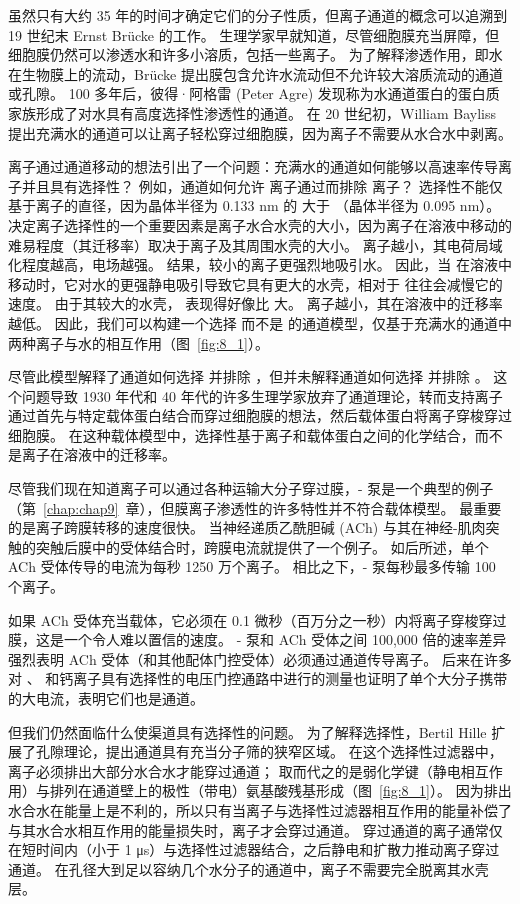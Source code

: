 虽然只有大约 35 年的时间才确定它们的分子性质，但离子通道的概念可以追溯到 19 世纪末 Ernst Brücke 的工作。
生理学家早就知道，尽管细胞膜充当屏障，但细胞膜仍然可以渗透水和许多小溶质，包括一些离子。
为了解释渗透作用，即水在生物膜上的流动，Brücke 提出膜包含允许水流动但不允许较大溶质流动的通道或孔隙。
100 多年后，彼得·阿格雷 (Peter Agre) 发现称为水通道蛋白的蛋白质家族形成了对水具有高度选择性渗透性的通道。
在 20 世纪初，William Bayliss 提出充满水的通道可以让离子轻松穿过细胞膜，因为离子不需要从水合水中剥离。


离子通过通道移动的想法引出了一个问题：充满水的通道如何能够以高速率传导离子并且具有选择性？
例如，通道如何允许  离子通过而排除  离子？
选择性不能仅基于离子的直径，因为晶体半径为 0.133 nm 的  大于 （晶体半径为 0.095 nm）。
决定离子选择性的一个重要因素是离子水合水壳的大小，因为离子在溶液中移动的难易程度（其迁移率）取决于离子及其周围水壳的大小。
离子越小，其电荷局域化程度越高，电场越强。
结果，较小的离子更强烈地吸引水。
因此，当  在溶液中移动时，它对水的更强静电吸引导致它具有更大的水壳，相对于  往往会减慢它的速度。
由于其较大的水壳， 表现得好像比  大。
离子越小，其在溶液中的迁移率越低。
因此，我们可以构建一个选择  而不是  的通道模型，仅基于充满水的通道中两种离子与水的相互作用（图~\ref{fig:8_1}）。


尽管此模型解释了通道如何选择  并排除 ，但并未解释通道如何选择  并排除 。
这个问题导致 1930 年代和 40 年代的许多生理学家放弃了通道理论，转而支持离子通过首先与特定载体蛋白结合而穿过细胞膜的想法，然后载体蛋白将离子穿梭穿过细胞膜。
在这种载体模型中，选择性基于离子和载体蛋白之间的化学结合，而不是离子在溶液中的迁移率。


尽管我们现在知道离子可以通过各种运输大分子穿过膜，- 泵是一个典型的例子（第~\ref{chap:chap9}~章），但膜离子渗透性的许多特性并不符合载体模型。
最重要的是离子跨膜转移的速度很快。 
当神经递质乙酰胆碱 (ACh) 与其在神经-肌肉突触的突触后膜中的受体结合时，跨膜电流就提供了一个例子。
如后所述，单个 ACh 受体传导的电流为每秒 1250 万个离子。
相比之下，- 泵每秒最多传输 100 个离子。


如果 ACh 受体充当载体，它必须在 0.1 微秒（百万分之一秒）内将离子穿梭穿过膜，这是一个令人难以置信的速度。
- 泵和 ACh 受体之间 100,000 倍的速率差异强烈表明 ACh 受体（和其他配体门控受体）必须通过通道传导离子。
后来在许多对 、 和钙离子具有选择性的电压门控通路中进行的测量也证明了单个大分子携带的大电流，表明它们也是通道。

但我们仍然面临什么使渠道具有选择性的问题。
为了解释选择性，Bertil Hille 扩展了孔隙理论，提出通道具有充当分子筛的狭窄区域。
在这个选择性过滤器中，离子必须排出大部分水合水才能穿过通道；
取而代之的是弱化学键（静电相互作用）与排列在通道壁上的极性（带电）氨基酸残基形成（图~\ref{fig:8_1}）。
因为排出水合水在能量上是不利的，所以只有当离子与选择性过滤器相互作用的能量补偿了与其水合水相互作用的能量损失时，离子才会穿过通道。
穿过通道的离子通常仅在短时间内（小于 1 μs）与选择性过滤器结合，之后静电和扩散力推动离子穿过通道。
在孔径大到足以容纳几个水分子的通道中，离子不需要完全脱离其水壳层。


